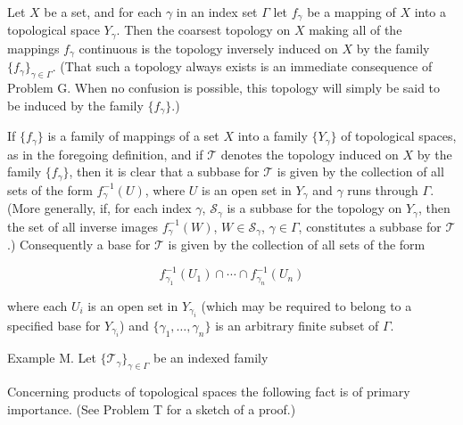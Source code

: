 Let $X$ be a set, and for each $\gamma$ in an index set $\Gamma$ let $f_{\gamma}$ be a mapping of $X$ into a topological space $Y_{\gamma}$. Then the coarsest topology on $X$ making all of the mappings $f_{\gamma}$ continuous is the topology inversely induced on $X$ by the family $\{f_{\gamma}\}_{\gamma \in \Gamma}$. (That such a topology always exists is an immediate consequence of Problem G. When no confusion is possible, this topology will simply be said to be induced by the family $\{f_{\gamma}\}$.)

If $\{f_{\gamma}\}$ is a family of mappings of a set $X$ into a family $\{Y_{\gamma}\}$ of topological spaces, as in the foregoing definition, and if $\mathcal{T}$ denotes the topology induced on $X$ by the family $\{f_{\gamma}\}$, then it is clear that a subbase for $\mathcal{T}$ is given by the collection of all sets of the form $f_{\gamma}^{-1}(U)$, where $U$ is an open set in $Y_{\gamma}$ and $\gamma$ runs through $\Gamma$. (More generally, if, for each index $\gamma$, $\mathcal{S}_{\gamma}$ is a subbase for the topology on $Y_{\gamma}$, then the set of all inverse images $f_{\gamma}^{-1}(W)$, $W \in \mathcal{S}_{\gamma}$, $\gamma \in \Gamma$, constitutes a subbase for $\mathcal{T}$.) Consequently a base for $\mathcal{T}$ is given by the collection of all sets of the form

$$f_{\gamma_{1}}^{-1}(U_{1}) \cap \cdots \cap f_{\gamma_{n}}^{-1}(U_{n})$$

where each $U_{i}$ is an open set in $Y_{\gamma_{i}}$ (which may be required to belong to a specified base for $Y_{\gamma_{i}}$) and $\{\gamma_{1}, \ldots, \gamma_{n}\}$ is an arbitrary finite subset of $\Gamma$.

Example M. Let $\{\mathcal{T}_{\gamma}\}_{\gamma \in \Gamma}$ be an indexed family

Concerning products of topological spaces the following fact is of primary importance. (See Problem T for a sketch of a proof.)
